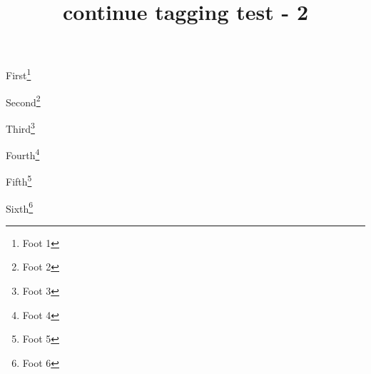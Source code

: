 \documentclass[a5paper,twoside]{article}
\title{continue tagging test - 2}
\begin{document}
First\footnote{Foot 1} \kant[1]

Second\footnote{Foot 2} \kant[2]

Third\footnote{Foot 3} \kant[3]

\contstop %

Fourth\footnote{Foot 4} \kant[4]

Fifth\footnote{Foot 5} \kant[5]

\contgo %

Sixth\footnote{Foot 6} \kant[6]
\end{document}
